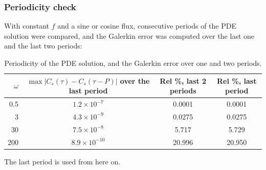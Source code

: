 \documentclass[11pt,a4paper]{article}
\begin{document}
\subsubsection{Periodicity check}
With constant $f$ and a sine or cosine flux, consecutive periods of the PDE solution were compared, and the Galerkin error was computed over the last one and the last two periods:
\begin{table}[H]\centering\small
\begin{tabular}{rccc}\toprule
$\omega$ & $\max|C_s(\tau)-C_s(\tau-P)|$ over the last period & Rel \%, last 2 periods & Rel \%, last period\\\midrule
0.5 & $1.2\times10^{-7}$ & 0.0001 & 0.0001\\
3 & $4.3\times10^{-9}$ & 0.0275 & 0.0275\\
30 & $7.5\times10^{-8}$ & 5.717 & 5.729\\
200 & $8.9\times10^{-10}$ & 20.996 & 20.950\\\bottomrule
\end{tabular}
\caption{Periodicity of the PDE solution, and the Galerkin error over one and two periods.}
\end{table}
The last period is used from here on.
\end{document}
